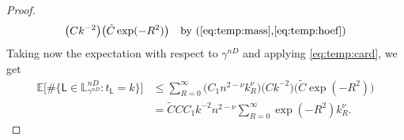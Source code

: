 \documentclass[11pt]{article}
\begin{document}
\begin{proof}
\begin{align*}
    \big(Ck^{-2} \big) \big( \tilde C \exp(-R^2) \big)\quad \text{by (\ref{eq:temp:mass},\ref{eq:temp:hoef})}
    \end{align*}
    Taking now the expectation with respect to $\gamma^{nD}$ and applying \eqref{eq:temp:card}, we get
    \begin{align*}
    \mathbb{E}\Big[ \#   \{   \mathsf{L}\in \mathbb{L}^{nD}_{\gamma^{nD}}: t_\mathsf{L}=k \}  \Big]
    &	\leq \sum_{R=0}^\infty
    \big( C_1  n^{2-\nu} k_R^{\nu} \big) \big(Ck^{-2} \big) 
    \big(\tilde C \exp(-R^2)\big) \\&=\tilde C CC_1 k^{-2}n^{2-\nu}  \sum_{R=0}^\infty  \exp(-R^2) k_R^{\nu}.
    \end{align*} 
    
    
    

\end{proof}
\end{document}

